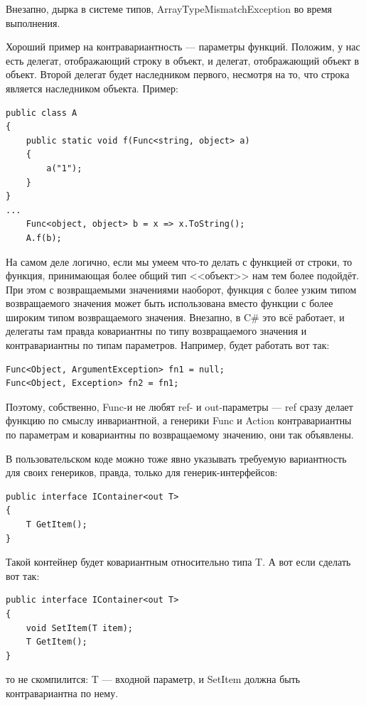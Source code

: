 \documentclass[a5paper]{article}
\begin{document}
Внезапно, дырка в системе типов, ArrayTypeMismatchException во время выполнения.

Хороший пример на контравариантность --- параметры функций. Положим, у нас есть делегат, отображающий строку в объект, и делегат, отображающий объект в объект. Второй делегат будет наследником первого, несмотря на то, что строка является наследником объекта. Пример:

\begin{verbatim}
public class A
{
    public static void f(Func<string, object> a)
    {
        a("1");
    }
}
...
    Func<object, object> b = x => x.ToString();
    A.f(b);
\end{verbatim}

На самом деле логично, если мы умеем что-то делать с функцией от строки, то функция, принимающая более общий тип <<объект>> нам тем более подойдёт. При этом с возвращаемыми значениями наоборот, функция с более узким типом возвращаемого значения может быть использована вместо функции с более широким типом возвращаемого значения. Внезапно, в C\# это всё работает, и делегаты там правда ковариантны по типу возвращаемого значения и контравариантны по типам параметров. Например, будет работать вот так:

\begin{verbatim}
Func<Object, ArgumentException> fn1 = null;
Func<Object, Exception> fn2 = fn1;
\end{verbatim}

Поэтому, собственно, Func-и не любят ref- и out-параметры --- ref сразу делает функцию по смыслу инвариантной, а генерики Func и Action контравариантны по параметрам и ковариантны по возвращаемому значению, они так объявлены.

В пользовательском коде можно тоже явно указывать требуемую вариантность для своих генериков, правда, только для генерик-интерфейсов:

\begin{verbatim}
public interface IContainer<out T>
{
    T GetItem();
}
\end{verbatim}

Такой контейнер будет ковариантным относительно типа T. А вот если сделать вот так:

\begin{verbatim}
public interface IContainer<out T>
{
    void SetItem(T item);
    T GetItem();
}
\end{verbatim}

то не скомпилится: T --- входной параметр, и SetItem должна быть контравариантна по нему.
\end{document}
